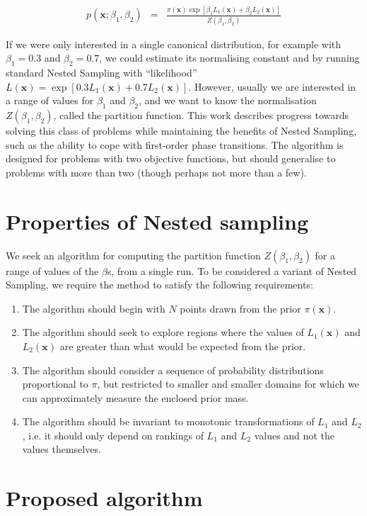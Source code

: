 \documentclass[journal,article,accept,moreauthors,pdftex,12pt,a4paper]{mdpi}
\newcommand{\xx}{\boldsymbol{x}}
\begin{document}
\begin{eqnarray}
p(\xx; \beta_1, \beta_2) &=& \frac{\pi(\xx)\exp\left[\beta_1L_1(\xx)+\beta_2L_2(\xx)\right]}
{Z(\beta_1, \beta_2)}
\end{eqnarray}

If we were only interested in a single canonical distribution, for example
with $\beta_1 = 0.3$ and $\beta_2 = 0.7$, we could estimate its normalising
constant and by running standard Nested Sampling with ``likelihood''
$L(\xx) = \exp\left[0.3L_1(\xx) + 0.7L_2(\xx)\right]$. However, usually we
are interested in a range of values for $\beta_1$ and $\beta_2$, and we
want to know the normalisation $Z(\beta_1, \beta_2)$, called the
partition function. This work describes
progress towards solving this class of problems while maintaining the benefits
of Nested Sampling, such as the ability to cope with first-order phase
transitions. The algorithm is designed for problems with two objective
functions, but should generalise to problems with more than two (though perhaps
not more than a few).

\section{Properties of Nested sampling}

We seek an algorithm for computing the partition function
$Z(\beta_1, \beta_2)$ for a range of values of the $\beta$s, from a single
run. To be considered a variant of Nested Sampling, we require the method
to satisfy the following requirements:
\begin{enumerate}
\item The algorithm should begin with $N$ points drawn from the prior $\pi(\xx)$.
\item The algorithm should seek to explore regions where the values of
$L_1(\xx)$ and $L_2(\xx)$ are greater than what would be expected from the
prior.
\item The algorithm should consider a sequence of probability
distributions proportional to $\pi$, but restricted to smaller and smaller
domains for which we can approximately measure the enclosed prior mass.
\item The algorithm should be invariant to monotonic transformations of
$L_1$ and $L_2$, i.e. it should only depend on rankings of $L_1$ and $L_2$
values and not the values themselves.
\end{enumerate}

\section{Proposed algorithm}
\end{document}
